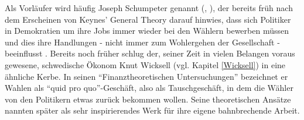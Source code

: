 Als Vorläufer wird häufig Joseph Schumpeter genannt (\textcite[S. 519]{Snowdon2005}, \textcite[S. 95]{Warsh}), der bereits früh nach dem Erscheinen von Keynes' General Theory darauf hinwies, dass sich Politiker in Demokratien  um ihre Jobs immer wieder bei den Wählern bewerben müssen und dies ihre Handlungen - nicht immer zum Wohlergehen der Gesellschaft - beeinflusst \parencite{Schumpeter1942}. Bereits noch früher schlug der, seiner Zeit in vielen Belangen voraus gewesene, schwedische Ökonom Knut Wicksell (vgl. Kapitel \ref{Wicksell}) in eine ähnliche Kerbe. In seinen "`Finanztheoretischen Untersuchungen"' \parencite{Wicksell1896} bezeichnet er Wahlen als "`quid pro quo"'-Geschäft, also als Tauschgeschäft, in dem die Wähler von den Politikern etwas zurück bekommen wollen. Seine theoretischen Ansätze nannten \textcite[S. 8]{Buchanan1962} später als sehr inspirierendes Werk für ihre eigene bahnbrechende Arbeit.

